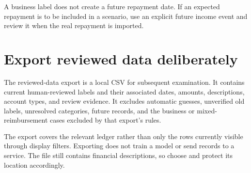 A business label does not create a future repayment date. If an expected repayment is to be included in a scenario, use an explicit future income event and review it when the real repayment is imported.

\section{Export reviewed data deliberately}
The reviewed-data export is a local CSV for subsequent examination. It contains current human-reviewed labels and their associated dates, amounts, descriptions, account types, and review evidence. It excludes automatic guesses, unverified old labels, unresolved categories, future records, and the business or mixed-reimbursement cases excluded by that export's rules.

The export covers the relevant ledger rather than only the rows currently visible through display filters. Exporting does not train a model or send records to a service. The file still contains financial descriptions, so choose and protect its location accordingly.


